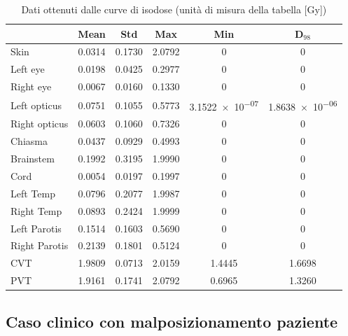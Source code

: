 \documentclass[a4paper,12pt]{article}
\begin{document}
                \begin{table}[H]
                        \centering
                        \label{tab:dati_caso_clinico_carbon}
                        \begin{tabular}{
                            l | c | c | c | c | c |
                        }
                            \toprule
                            & Mean & Std & Max & Min & D$_{98}$ \\
                            \midrule
                            Skin & 0.0314 & 0.1730 & 2.0792 & 0 & 0 \\
                            Left eye & 0.0198 & 0.0425 & 0.2977 & 0 & 0 \\
                            Right eye & 0.0067 & 0.0160 & 0.1330 & 0 & 0 \\
                            Left opticus & 0.0751 & 0.1055 & 0.5773 & \num{3.1522e-07} & \num{1.8638e-06} \\
                            Right opticus & 0.0603 & 0.1060 & 0.7326 & 0 & 0 \\
                            Chiasma & 0.0437 & 0.0929 & 0.4993 & 0 & 0 \\
                            Brainstem & 0.1992 & 0.3195 & 1.9990 & 0 & 0 \\
                            Cord & 0.0054 & 0.0197 & 0.1997 & 0 & 0 \\
                            Left Temp & 0.0796 & 0.2077 & 1.9987 & 0 & 0 \\
                            Right Temp & 0.0893 & 0.2424 & 1.9999 & 0 & 0 \\
                            Left Parotis & 0.1514 & 0.1603 & 0.5690 & 0 & 0 \\
                            Right Parotis & 0.2139 & 0.1801 & 0.5124 & 0 & 0 \\
                            CVT & 1.9809 & 0.0713 & 2.0159 & 1.4445 & 1.6698 \\
                            PVT & 1.9161 & 0.1741 & 2.0792 & 0.6965 & 1.3260 \\
                            \bottomrule
                        \end{tabular}
                        \caption{Dati ottenuti dalle curve di isodose (unità di misura della tabella [\unit{\gray}])}
                    \end{table}    

        \subsection{Caso clinico con malposizionamento paziente}
\end{document}
